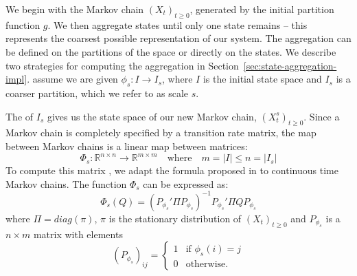 We begin with the Markov chain $(X_t)_{t \ge 0}$, generated by the initial partition function $g$. We then aggregate states until only one state remains -- this represents the coarsest possible representation of our system. The aggregation can be defined on the partitions of the space or directly on the states. We describe two strategies for computing the aggregation in Section~\ref{sec:state-aggregation-impl}. assume we are given $\phi_s: I\rightarrow I_s$, where $I$ is the initial state space and $I_s$ is a coarser partition, which we refer to as scale $s$. 

The  of $I_s$ gives us the state space of our new Markov chain, $(X_t^{s})_{t \ge 0}$. Since a Markov chain is completely specified by a transition rate matrix, the map between Markov chains is a linear map between matrices: 
$$\Phi_s: \mathbb{R}^{n \times n} \rightarrow \mathbb{R}^{m \times m} \quad \mbox{where} \quad m = |I| \leq n =|I_s|$$
To compute this matrix , we adapt the formula proposed in \cite{5746509} to continuous time Markov chains. The function $\Phi_s$ can be expressed as:
\begin{equation}
	\label{eq:ctmc-state-aggregation}
	\Phi_s(Q) = (P_{\phi_s}' \Pi P_{\phi_s})^{-1} P_{\phi_s}' \Pi Q P_{\phi_s}
\end{equation}
where $\Pi = diag(\pi)$, $\pi$ is the stationary distribution of $(X_t)_{t \ge 0}$ and $P_{\phi_s}$ is a 
$n \times m$ matrix with elements
\begin{equation}
	\nonumber
	\left(P_{\phi_s}\right)_{ij} = 
		\left\{
			\begin{array}{ll}
				1 & \mbox{if } \phi_s(i) = j \\
				0 & \mbox{otherwise}.
			\end{array}
		\right.
\end{equation}
%
%
%

